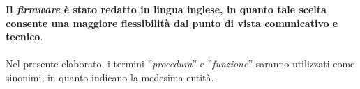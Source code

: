 \textbf{Il \textit{firmware} è stato redatto in lingua inglese, in quanto tale scelta consente una maggiore flessibilità dal punto di vista comunicativo e tecnico}.\\\\
Nel presente elaborato, i termini ''\textit{procedura}'' e ''\textit{funzione}'' saranno utilizzati come sinonimi, in quanto indicano la medesima entità.
